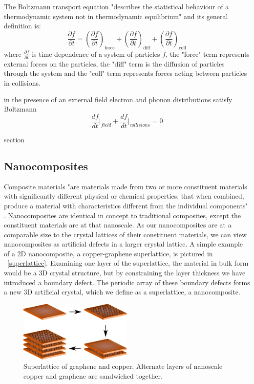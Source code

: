 \documentclass[a4paper,10pt,journal]{IEEEtran}
\newcommand{\figref}[2][\figurename~]{#1\ref{#2}}
\begin{document}
The Boltzmann transport equation "describes the statistical behaviour
of a thermodynamic system not in thermodynamic equilibrium"
\cite{wiki-boltz} and its general definition is:
\begin{equation}
\label{boltz-trans}
	\frac{\partial f}{\partial t} = \left(\frac{\partial f}{\partial
	t}\right)_\mathrm{force} + \left(\frac{\partial f}{\partial t}\right)_\mathrm{diff}+ \left(\frac{\partial f}{\partial t}\right)_\mathrm{coll}
\end{equation}
where $\frac{\partial f}{\partial t}$ is time dependence of a system
of particles $f$, the "force" term represents external forces on the
particles, the "diff" term is the diffusion of particles through the
system and the "coll" term represents forces acting between particles
in collisions.

in the presence of an external field electron and phonon distributions
satisfy Boltzmann
\begin{equation}
\label{boltz-specific}
	\frac{df}{dt}\bigg|_{field} + \frac{df}{dt}\bigg|_{collisions} = 0
\end{equation}

section

\subsection{Nanocomposites}

Composite materials "are materials made from two or more constituent
materials with significantly different physical or chemical
properties, that when combined, produce a material with
characteristics different from the individual
components" \cite{wiki-composite}. Nanocomposites are identical in
concept to traditional composites, except the constituent materials
are at that nanoscale. As our nanocomposites are at a comparable size
to the crystal lattices of their constituent materials, we can view
nanocomposites as artificial defects in a larger crystal lattice. A
simple example of a 2D nanocomposite, a copper-graphene superlattice,
is pictured in \figref{superlattice}. Examining one layer of the
superlattice, the material in bulk form would be a 3D crystal structure,
but by constraining the layer thickness we have introduced a boundary
defect. The periodic array of these boundary defects forms a new 3D
artificial crystal, which we define as a superlattice, a nanocomposite.

\begin{figure}
	\centering
	\includegraphics[width=0.5\textwidth]{graphene-superlattice.eps}
	\caption{Superlattice of graphene and copper. Alternate layers of
	nanoscale copper and graphene are sandwiched together.}
\end{figure}
\end{document}
